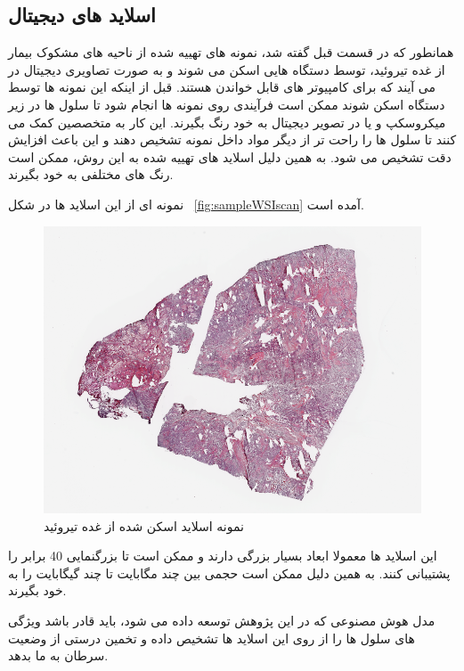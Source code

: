 \subsection{اسلاید های دیجیتال}\label{subsec:اسلاید-های-دیجیتال}
همانطور که در قسمت قبل گفته شد، نمونه های تهییه شده از ناحیه های مشکوک بیمار از غده تیروئید، توسط دستگاه هایی اسکن می شوند و به صورت تصاویری دیجیتال در می آیند که برای کامپیوتر های قابل خواندن هستند.
قبل از اینکه این نمونه ها توسط دستگاه اسکن شوند ممکن است فرآیندی روی نمونه ها انجام شود تا سلول ها در زیر میکروسکپ و یا در تصویر دیجیتال به خود رنگ بگیرند.
این کار به متخصصین کمک می کنند تا سلول ها را راحت تر از دیگر مواد داخل نمونه تشخیص دهند و این باعث افزایش دقت تشخیص می شود.
به همین دلیل اسلاید های تهییه شده به این روش، ممکن است رنگ های مختلفی به خود بگیرند.


نمونه ای از این اسلاید ها در شکل ~\autoref{fig:sampleWSIscan} آمده است.
\begin{figure}
    \begin{center}
        \includegraphics[width=\linewidth]{figs/Sample_WSI.PNG}
    \end{center}
    \caption{نمونه اسلاید اسکن شده از غده تیروئید}
    \label{fig:sampleWSIscan}
\end{figure}
این اسلاید ها معمولا ابعاد بسیار بزرگی دارند و ممکن است تا بزرگنمایی 40 برابر را پشتیبانی کنند.
به همین دلیل ممکن است حجمی بین چند مگابایت تا چند گیگابایت را به خود بگیرند.

مدل هوش مصنوعی که در این پژوهش توسعه داده می شود، باید قادر باشد ویژگی های سلول ها را از روی این اسلاید ها تشخیص داده و تخمین درستی از وضعیت سرطان به ما بدهد.